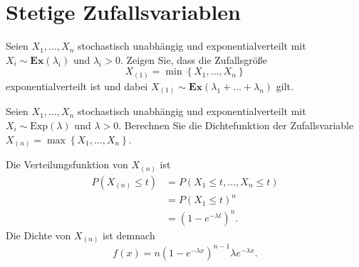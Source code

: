 \section{Stetige Zufallsvariablen}


Seien $X_1, \dots, X_n$ stochastisch unabhängig und exponentialverteilt mit
$X_i\sim \mathbf{Ex}(\lambda_i)$ und $\lambda_i>0$. Zeigen Sie, dass die
Zufallsgröße 
\begin{equation*}
    X_{(1)} = \min \left\{ X_1, \dots, X_n \right\} 
\end{equation*}
exponentialverteilt ist und dabei $X_{(1)} \sim \mathbf{Ex}(\lambda_1+\dots+\lambda_n)$ gilt.


 Seien $X_1, \dots, X_n$
stochastisch unabhängig und exponentialverteilt mit $X_i\sim
\text{Exp}(\lambda)$ und $\lambda>0$. Berechnen Sie die Dichtefunktion der
Zufallsvariable $X_{(n)} = \max \left\{ X_1,\dots ,X_n \right\}$.

\solution Die Verteilungsfunktion von $X_{(n)}$ ist 
\begin{align*}
    P\left( X_{(n)} \leq t \right) &= P\left( X_1 \leq t,\dots ,X_n \leq t \right) \\
    &= P\left( X_1 \leq t \right)^{n} \\
    &= \left( 1- e^{-\lambda t} \right)^{n}. 
\end{align*}
Die Dichte von $X_{(n)}$ ist demnach
\begin{equation*}
    f(x) = n \left( 1- e^{-\lambda x} \right)^{n-1} \lambda e^{-\lambda x}. 
\end{equation*}



